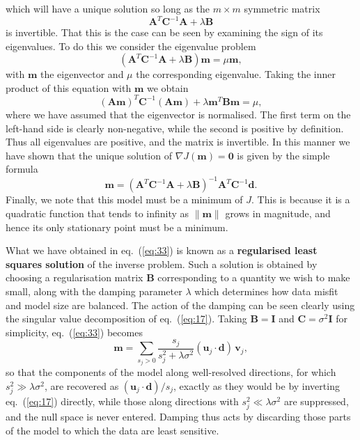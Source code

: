 which will have a unique solution so long as the $m \times m$ symmetric matrix
\begin{equation}
    \mathbf{A}^{T}\mathbf{C}^{-1}\mathbf{A} + \lambda \mathbf{B}
    \label{eq:30}
\end{equation}
is invertible. That this is the case can be seen by examining the sign of its eigenvalues. To do this we consider the eigenvalue problem
\begin{equation}
    (\mathbf{A}^{T}\mathbf{C}^{-1}\mathbf{A} + \lambda \mathbf{B})\mathbf{m} = \mu \mathbf{m},
    \label{eq:31}
\end{equation}
with $\mathbf{m}$ the eigenvector and $\mu$ the corresponding eigenvalue. Taking the inner product of this equation with $\mathbf{m}$ we obtain
\begin{equation}
    (\mathbf{A}\mathbf{m})^{T}\mathbf{C}^{-1}(\mathbf{A}\mathbf{m}) + \lambda \mathbf{m}^{T}\mathbf{B}\mathbf{m} = \mu,
    \label{eq:32}
\end{equation}
where we have assumed that the eigenvector is normalised. The first term on the left-hand side is clearly non-negative, 
while the second is positive by definition. Thus all eigenvalues are positive, and the matrix is invertible. In this 
manner we have shown that the unique solution of $\nabla J(\mathbf{m})=\mathbf{0}$ is given by the simple formula
\begin{equation}
    \mathbf{m} = (\mathbf{A}^{T}\mathbf{C}^{-1}\mathbf{A} + \lambda \mathbf{B})^{-1} \mathbf{A}^{T}\mathbf{C}^{-1}\mathbf{d}.
    \label{eq:33}
\end{equation}
Finally, we note that this model must be a minimum of $J$. This is because it is a quadratic function that tends to 
infinity as $\|\mathbf{m}\|$ grows in magnitude, and hence its only stationary point must be a minimum.

What we have obtained in eq.~(\ref{eq:33}) is known as a \textbf{regularised least squares solution} of the inverse problem. Such a 
solution is obtained by choosing a regularisation matrix $\mathbf{B}$ corresponding to a quantity we wish to make 
small, along with the damping parameter $\lambda$ which determines how data misfit and model size are balanced. 
The action of the damping can be seen clearly using the singular value decomposition of eq.~(\ref{eq:17}). Taking 
$\mathbf{B}=\mathbf{I}$ and $\mathbf{C}=\sigma^{2}\mathbf{I}$ for simplicity, eq.~(\ref{eq:33}) becomes
\begin{equation}
    \mathbf{m}=\sum_{s_{j}>0}\frac{s_{j}}{s_{j}^{2}+\lambda\sigma^{2}}(\mathbf{u}_{j}\cdot\mathbf{d})\,\mathbf{v}_{j},
    \label{eq:34}
\end{equation}
so that the components of the model along well-resolved directions, for which $s_{j}^{2}\gg\lambda\sigma^{2}$, are 
recovered as $(\mathbf{u}_{j}\cdot\mathbf{d})/s_{j}$, exactly as they would be by inverting eq.~(\ref{eq:17}) directly, 
while those along directions with $s_{j}^{2}\ll\lambda\sigma^{2}$ are suppressed, and the null space is never entered. 
Damping thus acts by discarding those parts of the model to which the data are least sensitive.

